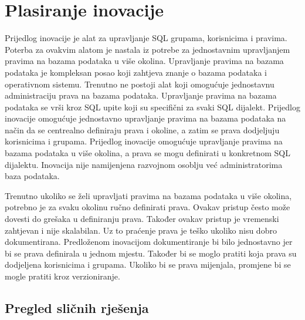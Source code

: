 \chapter{Plasiranje inovacije} \label{plasiranje_inovacije}

Prijedlog inovacije je alat za upravljanje SQL grupama, korisnicima i pravima.
Poterba za ovakvim alatom je nastala iz potrebe za jednostavnim upravljanjem
pravima na bazama podataka u više okolina. Upravljanje pravima na bazama
podataka je kompleksan posao koji zahtjeva znanje o bazama podataka i
operativnom sistemu. Trenutno ne postoji alat koji omogućuje jednostavnu
administraciju prava na bazama podataka. Upravljanje pravima na bazama
podataka se vrši kroz SQL upite koji su specifični za svaki SQL dijalekt.
Prijedlog inovacije omogućuje jednostavno upravljanje pravima na bazama
podataka na način da se centrealno definiraju prava i okoline, a zatim se
prava dodjeljuju korisnicima i grupama. Prijedlog inovacije omogućuje
upravljanje pravima na bazama podataka u više okolina, a prava se mogu
definirati u konkretnom SQL dijalektu. Inovacija nije namijenjena razvojnom
osoblju već administratorima baza podataka.

Trenutno ukoliko se želi upravljati pravima na bazama podataka u više okolina,
potrebno je za svaku okolinu ručno definirati prava. Ovakav pristup često može
dovesti do grešaka u definiranju prava. Također ovakav pristup je vremenski
zahtjevan i nije skalabilan. Uz to praćenje prava je teško ukoliko nisu dobro
dokumentirana. Predloženom inovacijom dokumentiranje bi bilo jednostavno jer bi
se prava definirala u jednom mjestu. Također bi se moglo pratiti koja prava su
dodjeljena korisnicima i grupama. Ukoliko bi se prava mijenjala, promjene bi se
mogle pratiti kroz verzioniranje.

\section{Pregled sličnih rješenja} \label{pregled_slicnih_rjesenja}
